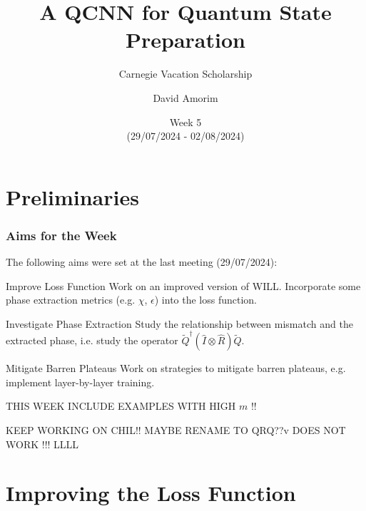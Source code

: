 \documentclass{beamer}
\title[QCNN State Preparation]{A QCNN for Quantum State Preparation}
\subtitle{Carnegie Vacation Scholarship}
\author[David Amorim]{David Amorim}
\institute[]{}
\date[05/08/2024]{Week 5 \\(29/07/2024 - 02/08/2024)}
\begin{document}
\frame{\titlepage}

\section{Preliminaries}
\begin{frame}
\frametitle{Aims for the Week}
The following aims were set at the last meeting (29/07/2024):

\begin{alertblock}{Improve Loss Function}
Work on an improved version of WILL. Incorporate some phase extraction metrics (e.g. $\chi$, $\epsilon$) into the loss function. 
\end{alertblock}

\begin{alertblock}{Investigate Phase Extraction}
Study the relationship between mismatch and the extracted phase, i.e. study the operator $\tilde{Q}^\dagger (\hat{I} \otimes\hat{R}) \tilde{Q}$. 
\end{alertblock}

\begin{alertblock}{Mitigate Barren Plateaus}
Work on strategies to mitigate barren plateaus, e.g. implement layer-by-layer training.
\end{alertblock}
\end{frame}

\begin{frame}
THIS WEEK INCLUDE EXAMPLES WITH HIGH $m$ !!

KEEP WORKING ON CHIL!! MAYBE RENAME TO QRQ??v DOES NOT WORK !!! LLLL

\end{frame}

\section{Improving the Loss Function}
\end{document}
